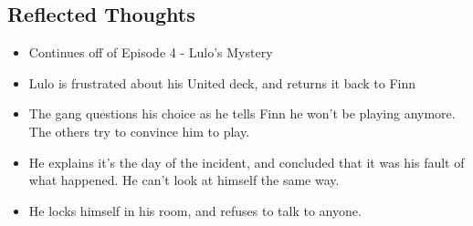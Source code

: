 \subsection{Reflected Thoughts}
\begin{itemize}
	\item Continues off of Episode 4 - Lulo's Mystery
	\item Lulo is frustrated about his United deck, and returns it back to Finn
	\item The gang questions his choice as he tells Finn he won't be playing anymore.
	      The others try to convince him to play.
	\item He explains it's the day of the incident, and concluded that it was his fault of
	      what happened. He can't look at himself the same way.
	\item He locks himself in his room, and refuses to talk to anyone.
\end{itemize}